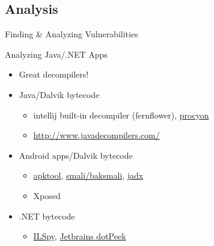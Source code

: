 \subsection{Analysis}

{
\begin{frame}[plain]

  {\huge Finding \& Analyzing Vulnerabilities}

  \vspace{16em}

\end{frame}
}


\begin{frame}[fragile]
  {Analyzing Java/.NET Apps}

  \begin{itemize}
    \item Great decompilers!
    \item Java/Dalvik bytecode
      \begin{itemize}
        \item intellij built-in decompiler (fernflower),
          \href{https://bitbucket.org/mstrobel/procyon/}{procyon}
        \item \url{http://www.javadecompilers.com/}
      \end{itemize}
    \item Android apps/Dalvik bytecode
      \begin{itemize}
        \item \href{http://ibotpeaches.github.io/Apktool/}{apktool},
          \href{https://bitbucket.org/JesusFreke/smali/}{smali/baksmali},
          \href{https://github.com/skylot/jadx}{jadx}
        \item Xposed
      \end{itemize}
    \item .NET bytecode
      \begin{itemize}
        \item \href{http://ilspy.net/}{ILSpy}, \href{https://www.jetbrains.com/decompiler/}{Jetbrains dotPeek}
      \end{itemize}

  \end{itemize}

\end{frame}


